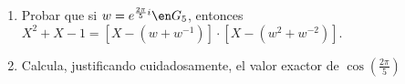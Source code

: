 \ejercicio
\begin{enumerate}[label=\roman*)] 
  \item Probar que si $w = e^{\frac{2\pi}{5}i} \en G_5$, entonces $X^2 + X -1 = [X - (w + w^{-1})] \cdot [X - (w^2 + w^{-2})].$

  \item Calcula, justificando cuidadosamente, el valor exactor de $\cos(\frac{2\pi}{5})$
 \end{enumerate}

